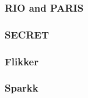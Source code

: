 \subsubsection*{\textbf{RIO and PARIS}}
\label{par:rioparis}


\subsubsection*{\textbf{SECRET}}
\label{par:secret}


\subsubsection*{\textbf{Flikker}}
\label{par:flikker}


\subsubsection*{\textbf{Sparkk}}
\label{par:sparkk}
